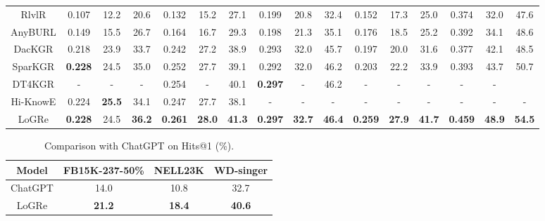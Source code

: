 \documentclass[sigconf]{acmart}
\begin{document}
\begin{table}[htb]
{\begin{tabular}{c|ccc|ccc|ccc|ccc|ccc}
			RlvlR &0.107 &12.2 &20.6 &0.132 &15.2 &27.1 &0.199 &20.8 &32.4 &0.152 &17.3 &25.0 &0.374 &32.0 &47.6\\
			AnyBURL &0.149 &15.5 &26.7 &0.164 &16.7 &29.3 &0.198 &21.3 &35.1 &0.176 &18.5 &25.2 &0.392 &34.1 &48.6\\
			\midrule[0.5pt]
			DacKGR &0.218 &23.9 &33.7 &0.242 &27.2 &38.9 &0.293 &32.0 &45.7 &0.197 &20.0 &31.6 &0.377 &42.1 &48.5\\
			SparKGR &\textbf{0.228} &24.5 &35.0 &0.252 &27.7 &39.1 &0.292 &32.0 &46.2 &0.203 &22.2 &33.9 &0.393 &43.7 &50.7\\
			DT4KGR &- &- &- &0.254 &- &40.1 &\textbf{0.297} &- &46.2 &- &- &- &- &-\\
			Hi-KnowE &0.224 &\textbf{25.5} &34.1 &0.247 &27.7 &38.1 &- &- &- &- &- &- &- &- &-\\
			\midrule[0.5pt]
			LoGRe &\textbf{0.228} &24.5 &\textbf{36.2} &\textbf{0.261} &\textbf{28.0} &\textbf{41.3} &\textbf{0.297} &\textbf{32.7} &\textbf{46.4} &\textbf{0.259} &\textbf{27.9} &\textbf{41.7} &\textbf{0.459} &\textbf{48.9} &\textbf{54.5}\\
			\bottomrule[1pt]
		\end{tabular}
	}
	\label{table:SKGC}
\end{table}


\begin{table}[htb]
	\centering
	\small
	\caption{Comparison with ChatGPT on Hits@1 (\%).}
	\begin{tabular}{c|c|c|c}
		\toprule[1pt]
		Model &FB15K-237-50\% &NELL23K &WD-singer\\
		\midrule[0.5pt]
		ChatGPT &14.0 &10.8 &32.7\\
		LoGRe &\textbf{21.2} &\textbf{18.4} &\textbf{40.6}\\
		\bottomrule[1pt]
	\end{tabular}
	\label{table:ChatGPT}
\end{table}
\end{document}
